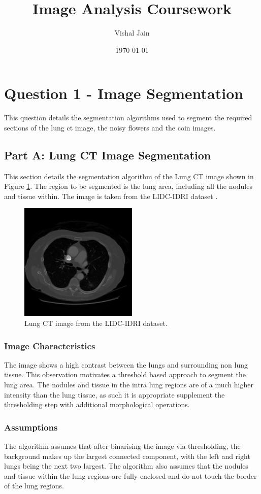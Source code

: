 \documentclass[11pt]{article}
\title{Image Analysis Coursework}
\author{Vishal Jain}
\date{\today}
\begin{document}
\section{Question 1 - Image Segmentation}
This question details the segmentation algorithms used to segment the required sections of the lung ct image, the noisy flowers and the coin images.
\subsection{Part A: Lung CT Image Segmentation}
This section details the segmentation algorithm of the Lung CT image shown in Figure \ref{fig:lung_ct_image}. The region to be segmented is the lung area, including all the nodules and tissue within. The image is taken from the LIDC-IDRI dataset \cite{lidc_idri}.
\begin{figure}[H]
    \centering
    \includegraphics[width=0.5\textwidth]{../data/CT.png}
    \caption{Lung CT image from the LIDC-IDRI dataset.}
    \label{fig:lung_ct_image}
\end{figure}

\subsubsection{Image Characteristics}
The image shows a high contrast between the lungs and surrounding non lung tissue. This observation motivates a threshold based approach to segment the lung area. The nodules and tissue in the intra lung regions are of a much higher intensity than the lung tissue, as such it is appropriate supplement the thresholding step with additional morphological operations.

\subsubsection{Assumptions}
The algorithm assumes that after binarising the image via thresholding, the background makes up the largest connected component, with the left and right lungs being the next two largest. The algorithm also assumes that the nodules and tissue within the lung regions are fully enclosed and do not touch the border of the lung regions.
\end{document}
